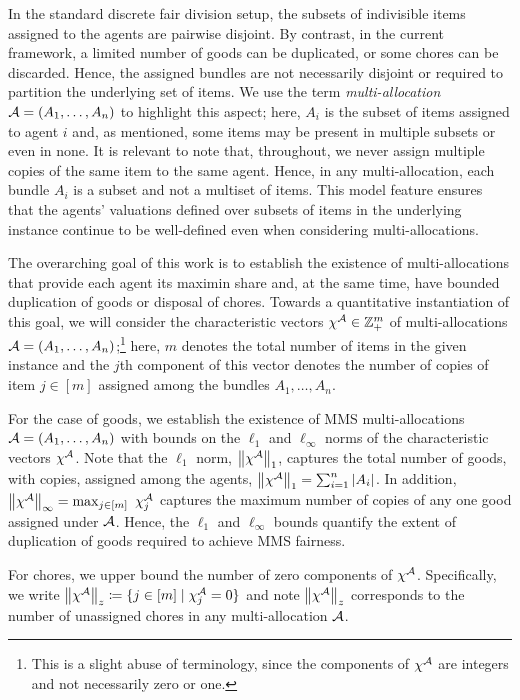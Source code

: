 In the standard discrete fair division setup, the subsets of indivisible items assigned to the agents are pairwise disjoint. By contrast, in the current framework, a limited number of goods can be duplicated, or some chores can be discarded. Hence, the assigned bundles are not necessarily disjoint or required to partition the underlying set of items. We use the term \emph{multi-allocation} $\mathcal{A} = (A_1, \ldots, A_n)$ to highlight this aspect; here, $A_i$ is the subset of items assigned to agent $i$ and, as mentioned, some items may be present in multiple subsets or even in none. It is relevant to note that, throughout, we never assign multiple copies of the same item to the same agent. Hence, in any multi-allocation, each bundle $A_i$ is a subset and not a multiset of items. This model feature ensures that the agents' valuations defined over subsets of items in the underlying instance continue to be well-defined even when considering multi-allocations. 

The overarching goal of this work is to establish the existence of multi-allocations that provide each agent its maximin share and, at the same time, have bounded duplication of goods or disposal of chores. Towards a quantitative instantiation of this goal, we will consider the characteristic vectors $\chi^{\mathcal{A}} \in \mathbb{Z}^m_+$ of multi-allocations $\mathcal{A} =(A_1, \ldots, A_n)$;\footnote{This is a slight abuse of terminology, since the components of $\chi^{\mathcal{A}}$ are integers and not necessarily zero or one.} here, $m$ denotes the total number of items in the given instance and the $j$th component of this vector denotes the number of copies of item $j \in [m]$ assigned among the bundles $A_1, \ldots, A_n$.    

For the case of goods, we establish the existence of MMS multi-allocations $\mathcal{A}=(A_1, \ldots, A_n)$ with bounds on the $\ell_1$ and $\ell_\infty$ norms of the characteristic vectors $\chi^{\mathcal{A}}$. Note that the $\ell_1$ norm, $\left\|\chi^{\mathcal{A}}\right\|_1$, captures the total number of goods, with copies, assigned among the agents,  $\left\|\chi^{\mathcal{A}}\right\|_1 = \sum_{i=1}^n |A_i|$. In addition, $\left\|\chi^{\mathcal{A}}\right\|_\infty = \max_{j \in [m]} \ \chi^{\mathcal{A}}_j$ captures the maximum number of copies of any one good assigned under $\mathcal{A}$. Hence, the $\ell_1$ and $\ell_\infty$ bounds quantify the extent of duplication of goods required to achieve MMS fairness. 

For chores, we upper bound the number of zero components of $\chi^{\mathcal{A}}$. Specifically, we write $\left\|\chi^{\mathcal{A}}\right\|_z \coloneqq \{ j \in [m] \mid \chi^{\mathcal{A}}_j = 0 \}$ and note $\left\|\chi^{\mathcal{A}}\right\|_z$ corresponds to the number of unassigned chores in any multi-allocation $\mathcal{A}$. 

